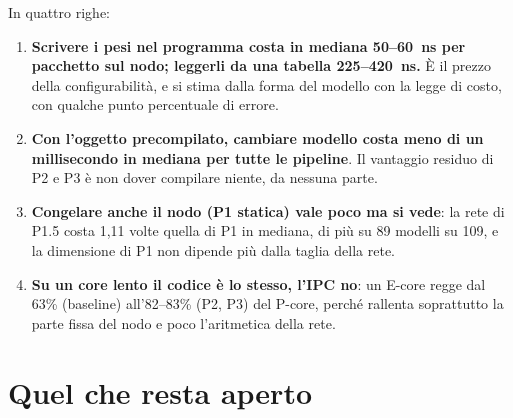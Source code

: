 \documentclass[11pt,a4paper,oneside]{report}
\begin{document}
\begin{lezione}
In quattro righe:
\begin{enumerate}
  \item \textbf{Scrivere i pesi nel programma costa in mediana 50--60~ns per
        pacchetto sul nodo; leggerli da una tabella 225--420~ns.} È il prezzo
        della configurabilità, e si stima dalla forma del modello con la legge di
        costo, con qualche punto percentuale di errore.
  \item \textbf{Con l'oggetto precompilato, cambiare modello costa meno di un
        millisecondo in mediana per tutte le pipeline}. Il vantaggio residuo di
        P2 e P3 è non dover compilare niente, da nessuna parte.
  \item \textbf{Congelare anche il nodo (P1 statica) vale poco ma si vede}: la
        rete di P1.5 costa 1,11 volte quella di P1 in mediana, di più su 89 modelli
        su 109, e la dimensione di P1 non dipende più dalla taglia della rete.
  \item \textbf{Su un core lento il codice è lo stesso, l'IPC no}: un E-core regge
        dal 63\% (baseline) all'82--83\% (P2, P3) del P-core, perché rallenta
        soprattutto la parte fissa del nodo e poco l'aritmetica della rete.
\end{enumerate}
\end{lezione}

\chapter{Quel che resta aperto}
\end{document}
